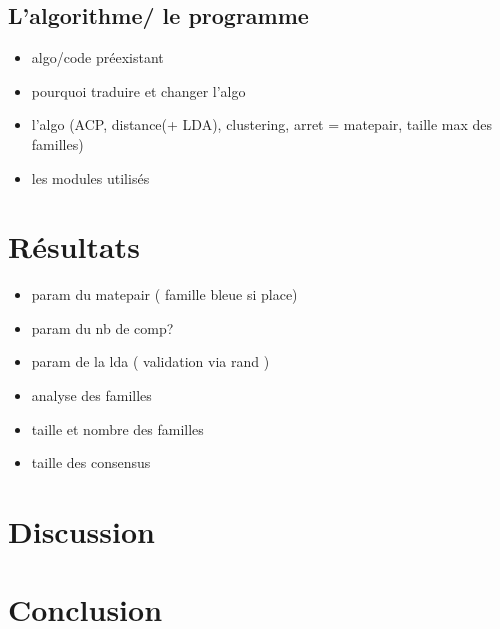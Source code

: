 \documentclass[a4paper,12pt]{article}
\begin{document}
\subsection{L'algorithme/ le programme}
	\begin{itemize}
	\item algo/code préexistant
	\item pourquoi traduire et changer l'algo
	\item l'algo (ACP, distance(+ LDA), clustering, arret = matepair, taille max des familles)
	\item les modules utilisés
	\end{itemize}
\section{Résultats}
\begin{itemize}
\item param du matepair ( famille bleue si place)
\item param du nb de comp?
\item param de la lda ( validation via rand )
\item analyse des familles
\item taille et nombre des familles
\item taille des consensus
\end{itemize}
\section{Discussion}
\section{Conclusion}
\end{document}
